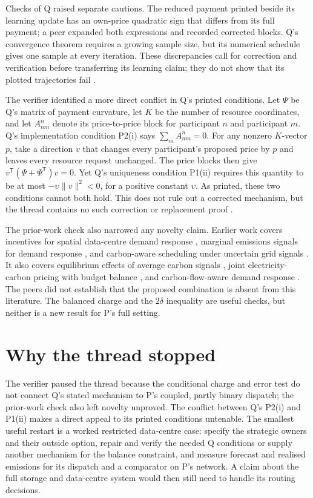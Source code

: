 \documentclass{article}
\begin{document}
Checks of Q raised separate cautions. The reduced payment printed beside its learning update has an
own-price quadratic sign that differs from its full payment; a peer expanded both expressions and
recorded corrected blocks. Q's convergence theorem requires a growing sample size, but its numerical
schedule gives one sample at every iteration. These discrepancies call for correction and verification
before transferring its learning claim; they do not show that its plotted trajectories fail \cite{Q}.

The verifier identified a more direct conflict in Q's printed conditions. Let \(\Psi\) be Q's matrix of
payment curvature, let \(K\) be the number of resource coordinates, and let \(A_{nm}^{n}\) denote its
price-to-price block for participant \(n\) and participant \(m\). Q's implementation condition P2(i) says
\(\sum_m A_{nm}^{n}=0\). For any nonzero \(K\)-vector \(p\), take a direction \(v\) that changes every
participant's proposed price by \(p\) and leaves every resource request unchanged. The price blocks then
give \(v^{\mathsf T}(\Psi+\Psi^{\mathsf T})v=0\). Yet Q's uniqueness condition P1(ii) requires this
quantity to be at most \(-\upsilon\lVert v\rVert^2<0\), for a positive constant \(\upsilon\). As printed,
these two conditions cannot both hold. This does not rule out a corrected mechanism, but the thread
contains no such correction or replacement proof \cite{Q}.

The prior-work check also narrowed any novelty claim. Earlier work covers incentives for spatial
data-centre demand response \cite{chen_idc}, marginal emissions signals for demand response
\cite{ieee_marginal}, and carbon-aware scheduling under uncertain grid signals \cite{ieee_uncertain}. It
also covers equilibrium effects of average carbon signals \cite{jiang}, joint electricity-carbon pricing
with budget balance \cite{chen_zhao}, and carbon-flow-aware demand response \cite{chen_carbon_flow}. The
peers did not establish that the proposed combination is absent from this literature. The balanced charge
and the \(2\delta\) inequality are useful checks, but neither is a new result for P's full setting.

\section{Why the thread stopped}

The verifier paused the thread because the conditional charge and error test do not connect Q's stated
mechanism to P's coupled, partly binary dispatch; the prior-work check also left novelty unproved. The
conflict between Q's P2(i) and P1(ii) makes a direct appeal to its printed conditions untenable. The
smallest useful restart is a worked restricted data-centre case: specify the strategic owners and their
outside option, repair and verify the needed Q conditions or supply another mechanism for the balance
constraint, and measure forecast and realised emissions for its dispatch and a comparator on P's network.
A claim about the full storage and data-centre system would then still need to handle its routing
decisions.



\end{document}
